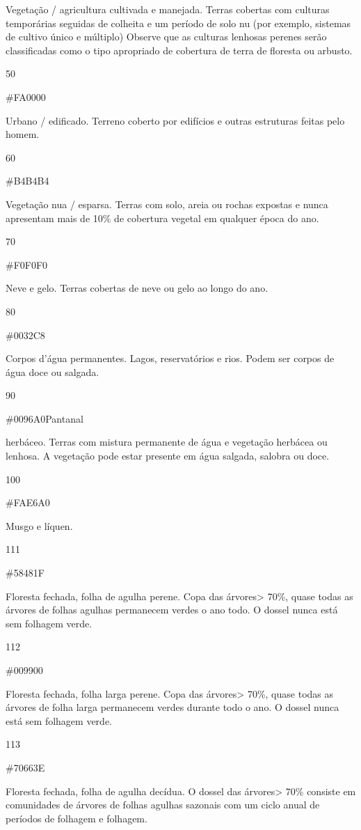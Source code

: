 \documentclass[
]{book}
\begin{document}
Vegetação / agricultura cultivada e manejada. Terras cobertas com culturas temporárias seguidas de colheita e um período de solo nu (por exemplo, sistemas de cultivo único e múltiplo) Observe que as culturas lenhosas perenes serão classificadas como o tipo apropriado de cobertura de terra de floresta ou arbusto.

50

\#FA0000

Urbano / edificado. Terreno coberto por edifícios e outras estruturas feitas pelo homem.

60

\#B4B4B4

Vegetação nua / esparsa. Terras com solo, areia ou rochas expostas e nunca apresentam mais de 10\% de cobertura vegetal em qualquer época do ano.

70

\#F0F0F0

Neve e gelo. Terras cobertas de neve ou gelo ao longo do ano.

80

\#0032C8

Corpos d'água permanentes. Lagos, reservatórios e rios. Podem ser corpos de água doce ou salgada.

90

\#0096A0Pantanal

herbáceo. Terras com mistura permanente de água e vegetação herbácea ou lenhosa. A vegetação pode estar presente em água salgada, salobra ou doce.

100

\#FAE6A0

Musgo e líquen.

111

\#58481F

Floresta fechada, folha de agulha perene. Copa das árvores\textgreater{} 70\%, quase todas as árvores de folhas agulhas permanecem verdes o ano todo. O dossel nunca está sem folhagem verde.

112

\#009900

Floresta fechada, folha larga perene. Copa das árvores\textgreater{} 70\%, quase todas as árvores de folha larga permanecem verdes durante todo o ano. O dossel nunca está sem folhagem verde.

113

\#70663E

Floresta fechada, folha de agulha decídua. O dossel das árvores\textgreater{} 70\% consiste em comunidades de árvores de folhas agulhas sazonais com um ciclo anual de períodos de folhagem e folhagem.
\end{document}
